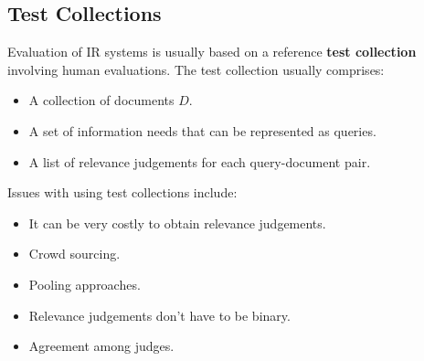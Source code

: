 \documentclass[a4paper,11pt]{article}
\begin{document}
\subsection{Test Collections}
Evaluation of IR systems is usually based on a reference \textbf{test collection} involving human evaluations.
The test collection usually comprises:
\begin{itemize}
    \item   A collection of documents $D$.
    \item   A set of information needs that can be represented as queries.
    \item   A list of relevance judgements for each query-document pair.
\end{itemize}

Issues with using test collections include:
\begin{itemize}
    \item   It can be very costly to obtain relevance judgements.
    \item   Crowd sourcing.
    \item   Pooling approaches.
    \item   Relevance judgements don't have to be binary.
    \item   Agreement among judges.
\end{itemize}
\end{document}
